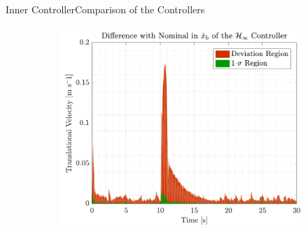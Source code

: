 \begin{frame}{Inner Controller}{Comparison of the Controllers}
\begin{figure}[H]
\begin{minipage}{0.45\linewidth}
\begin{figure}[H]
        \includegraphics[width=1\linewidth]{figures/xbdot_mc_rob_error}
      \end{figure}                
    \end{minipage}\hfill \\
  \end{figure}
\end{frame}




